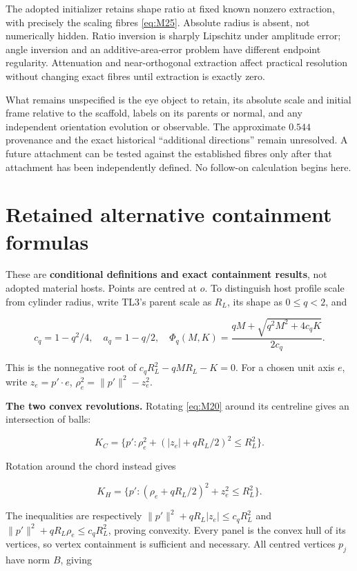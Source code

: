 \documentclass[11pt,a4paper]{article}
\begin{document}
The adopted initializer retains shape ratio at fixed known nonzero extraction, with precisely the scaling fibres \eqref{eq:M25}. Absolute radius is absent, not numerically hidden. Ratio inversion is sharply Lipschitz under amplitude error; angle inversion and an additive-area-error problem have different endpoint regularity. Attenuation and near-orthogonal extraction affect practical resolution without changing exact fibres until extraction is exactly zero.

What remains unspecified is the eye object to retain, its absolute scale and initial frame relative to the scaffold, labels on its parents or normal, and any independent orientation evolution or observable. The approximate \(0.544\) provenance and the exact historical \textquotedblleft{}additional directions\textquotedblright{} remain unresolved. A future attachment can be tested against the established fibres only after that attachment has been independently defined. No follow-on calculation begins here.

\clearpage\appendix
\section{Retained alternative containment formulas}

These are \textbf{conditional definitions and exact containment results}, not adopted material hosts. Points are centred at \(o\). To distinguish host profile scale from cylinder radius, write TL3's parent scale as \(R_L\), its shape as \(0\le q<2\), and

\[
c_q=1-q^2/4,\quad a_q=1-q/2,\quad
\Phi_q(M,K)=\frac{qM+\sqrt{q^2M^2+4c_qK}}{2c_q}.
\tag{MA1}\label{eq:MA1}
\]

This is the nonnegative root of \(c_qR_L^2-qMR_L-K=0\). For a chosen unit axis \(e\), write \(z_e=p'\cdot e\), \(\rho_e^2=\|p'\|^2-z_e^2\).

\textbf{The two convex revolutions.} Rotating \eqref{eq:M20} around its centreline gives an intersection of balls:

\[
K_C=\{p':\rho_e^2+(|z_e|+qR_L/2)^2\le R_L^2\}.
\tag{MA2}\label{eq:MA2}
\]

Rotation around the chord instead gives

\[
K_H=\{p':(\rho_e+qR_L/2)^2+z_e^2\le R_L^2\}.
\tag{MA3}\label{eq:MA3}
\]

The inequalities are respectively \(\|p'\|^2+qR_L|z_e|\le c_qR_L^2\) and \(\|p'\|^2+qR_L\rho_e\le c_qR_L^2\), proving convexity. Every panel is the convex hull of its vertices, so vertex containment is sufficient and necessary. All centred vertices \(p_j\) have norm \(B\), giving
\end{document}
